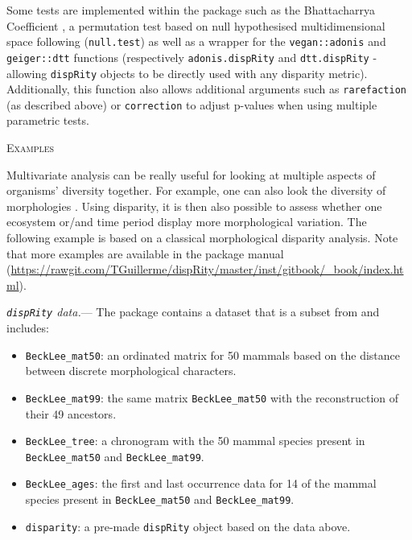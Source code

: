 \documentclass[12pt,letterpaper]{article}
\renewcommand{\section}[1]{%
\bigskip
\begin{center}
\begin{Large}
\normalfont\scshape #1
\medskip
\end{Large}
\end{center}}
\renewcommand{\subsubsection}[1]{%
\vspace{2ex}
\noindent
\textit{#1.}---}
\newcommand{\disp}{\texttt{dispRity} }
\begin{document}
Some tests are implemented within the package such as the Bhattacharrya Coefficient \citep[\texttt{bhatt.coeff};][]{Bhattacharyya,GuillermeCooper}, a permutation test based on null hypothesised multidimensional space following \cite{diaz2016global} (\texttt{null.test}) 
as well as a wrapper for the \texttt{vegan::adonis} \citep{oksanen2007vegan} and \texttt{geiger::dtt} \citep{geiger2008} functions (respectively \texttt{adonis.dispRity} and \texttt{dtt.dispRity} - allowing \texttt{dispRity} objects to be directly used with any disparity metric).
Additionally, this function also allows additional arguments such as \texttt{rarefaction} (as described above) or \texttt{correction} to adjust p-values when using multiple parametric tests.

\section{Examples}
Multivariate analysis can be really useful for looking at multiple aspects of organisms' diversity together.
For example, one can also look the diversity of morphologies \citep[or disparity;][]{foote1991morphological}.
Using disparity, it is then also possible to assess whether one ecosystem or/and time period display more morphological variation.
The following example is based on a classical morphological disparity analysis.
Note that more examples are available in the package manual (\url{https://rawgit.com/TGuillerme/dispRity/master/inst/gitbook/_book/index.html}).

\subsubsection{\disp data}
The package contains a dataset that is a subset from \cite{beckancient2014} and includes:

\begin{itemize}
    \item \texttt{BeckLee\_mat50}: an ordinated matrix for 50 mammals based on the distance between discrete morphological characters.
    \item \texttt{BeckLee\_mat99}: the same matrix \texttt{BeckLee\_mat50} with the reconstruction of their 49 ancestors.
    \item \texttt{BeckLee\_tree}: a chronogram with the 50 mammal species present in \texttt{BeckLee\_mat50} and \texttt{BeckLee\_mat99}.
    \item \texttt{BeckLee\_ages}: the first and last occurrence data for 14 of the mammal species present in \texttt{BeckLee\_mat50} and \texttt{BeckLee\_mat99}.
    \item \texttt{disparity}: a pre-made \disp object based on the data above.
\end{itemize}
\end{document}
